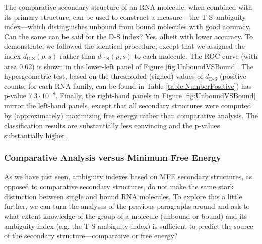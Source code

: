 \documentclass[10pt,letterpaper]{article}
\begin{document}
The comparative secondary structure of an RNA molecule, when combined with its primary structure, can be used to construct a measure---the T-S ambiguity index---which distinguishes unbound from bound molecules with good accuracy. Can the same can be said for the D-S index?
Yes, albeit with lower accuracy. To demonstrate, we followed the identical procedure, except that we assigned the index $d_\text{D-S}(p,s)$ rather than $d_\text{T-S}(p,s)$ to each molecule.  The ROC curve (with area 0.62) is shown in the lower-left panel of Figure \ref{fig:UnboundVSBound}. The hypergeometric test, based on the thresholded (signed) values of  $d_\text{D-S}$ (positive counts, for each RNA family, can be found in Table \ref{table:NumberPositive}) has p-value $7.3\cdot 10^{-8}$. Finally, the right-hand panels in Figure \ref{fig:UnboundVSBound} mirror the left-hand panels, except that all secondary structures were computed by (approximately) maximizing free energy rather than comparative analysis. The classification results are substantially less convincing and the p-values substantially higher.  

\subsubsection*{Comparative Analysis versus Minimum Free Energy}
As we have just seen, ambiguity indexes based on MFE secondary structures, as opposed to  comparative secondary structures, do not make the same stark 
distinction between single and bound RNA molecules. 
To explore this a little further, we can turn the analyses of the previous paragraphs around
and ask to what extent knowledge of the group of a molecule (unbound or bound) and its ambiguity index (e.g. the T-S ambiguity index) is sufficient to predict the source of the secondary structure---comparative or free energy? 
\end{document}
